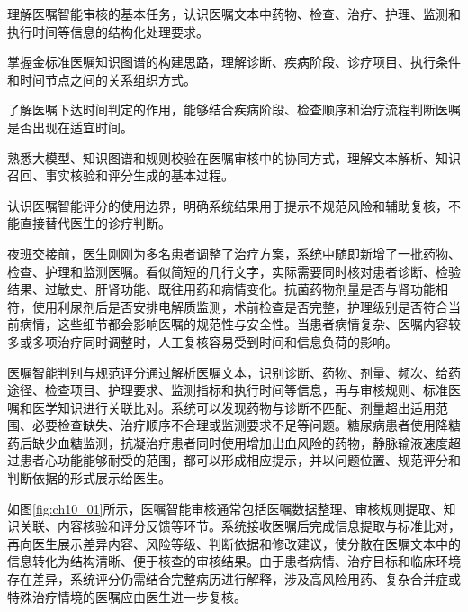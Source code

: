 \begin{sectionkeypoints}
\item 理解医嘱智能审核的基本任务，认识医嘱文本中药物、检查、治疗、护理、监测和执行时间等信息的结构化处理要求。
\item 掌握金标准医嘱知识图谱的构建思路，理解诊断、疾病阶段、诊疗项目、执行条件和时间节点之间的关系组织方式。
\item 了解医嘱下达时间判定的作用，能够结合疾病阶段、检查顺序和治疗流程判断医嘱是否出现在适宜时间。
\item 熟悉大模型、知识图谱和规则校验在医嘱审核中的协同方式，理解文本解析、知识召回、事实核验和评分生成的基本过程。
\item 认识医嘱智能评分的使用边界，明确系统结果用于提示不规范风险和辅助复核，不能直接替代医生的诊疗判断。
\end{sectionkeypoints}
夜班交接前，医生刚刚为多名患者调整了治疗方案，系统中随即新增了一批药物、检查、护理和监测医嘱。看似简短的几行文字，实际需要同时核对患者诊断、检验结果、过敏史、肝肾功能、既往用药和病情变化。抗菌药物剂量是否与肾功能相符，使用利尿剂后是否安排电解质监测，术前检查是否完整，护理级别是否符合当前病情，这些细节都会影响医嘱的规范性与安全性。当患者病情复杂、医嘱内容较多或多项治疗同时调整时，人工复核容易受到时间和信息负荷的影响。

医嘱智能判别与规范评分通过解析医嘱文本，识别诊断、药物、剂量、频次、给药途径、检查项目、护理要求、监测指标和执行时间等信息，再与审核规则、标准医嘱和医学知识进行关联比对。系统可以发现药物与诊断不匹配、剂量超出适用范围、必要检查缺失、治疗顺序不合理或监测要求不足等问题。糖尿病患者使用降糖药后缺少血糖监测，抗凝治疗患者同时使用增加出血风险的药物，静脉输液速度超过患者心功能能够耐受的范围，都可以形成相应提示，并以问题位置、规范评分和判断依据的形式展示给医生。

如图\ref{fig:ch10_01}所示，医嘱智能审核通常包括医嘱数据整理、审核规则提取、知识关联、内容核验和评分反馈等环节。系统接收医嘱后完成信息提取与标准比对，再向医生展示差异内容、风险等级、判断依据和修改建议，使分散在医嘱文本中的信息转化为结构清晰、便于核查的审核结果。由于患者病情、治疗目标和临床环境存在差异，系统评分仍需结合完整病历进行解释，涉及高风险用药、复杂合并症或特殊治疗情境的医嘱应由医生进一步复核。


\par
\noindent\begin{minipage}{\textwidth}
\centering
{}
\label{fig:ch10_01}
\end{minipage}
\par

